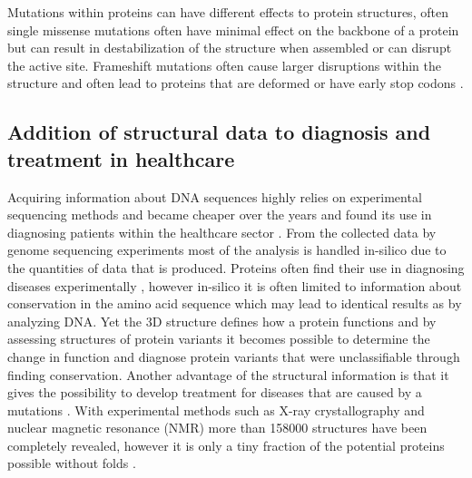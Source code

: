 Mutations within proteins can have different effects to protein structures, often single missense mutations often have minimal effect on the backbone of a protein \cite{feyfant_modeling_2007,chothia_relation_1986} but can result in destabilization of the structure when assembled or can disrupt the active site. Frameshift mutations often cause larger disruptions within the structure and often lead to proteins that are deformed or have early stop codons \cite{ogura_frameshift_2001}.
\label{subsec:GD_Structural_Levels_and_Mutation_Effects}


\subsection{Addition of structural data to diagnosis and treatment in healthcare}
Acquiring information about DNA sequences highly relies on experimental sequencing methods and became cheaper over the years \cite{nih_cost_nodate} and found its use in diagnosing patients within the healthcare sector \cite{ van_der_velde_gavin:_2017}.
From the collected data by genome sequencing experiments most of the analysis is handled in-silico due to the quantities of data that is produced. Proteins often find their use in diagnosing diseases experimentally \cite{hortin_introduction:_2010, bennion_protein_2002}, however in-silico it is often limited to information about conservation in the amino acid sequence which may lead to identical results as by analyzing DNA.
Yet the 3D structure defines how a protein functions \cite{nanev_how_2008} and by assessing structures of protein variants it becomes possible to determine the change in function and diagnose protein variants that were unclassifiable through finding conservation.
Another advantage of the structural information is that it gives the possibility to develop treatment for diseases that are caused by a mutations \cite{mail}. 
With experimental methods such as X-ray crystallography and nuclear magnetic resonance (NMR) more than 158000 structures \cite{wwpdb_wwpdb:_nodate} have been completely revealed, however it is only a tiny fraction of the potential proteins possible without folds \cite{ cantrill_chemiotics:_nodate}.
